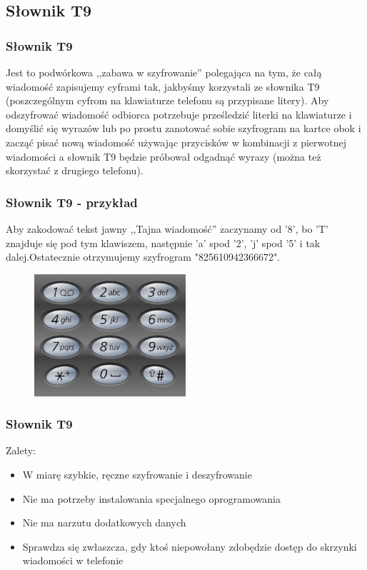 \documentclass[xcolor=table]{beamer}
\begin{document}
\subsection{Słownik T9}
\begin{frame}
  \frametitle{Słownik T9}
  Jest to podwórkowa ,,zabawa w szyfrowanie'' polegająca na tym, że całą wiadomość zapisujemy cyframi tak, jakbyśmy korzystali ze słownika T9 (poszczególnym cyfrom na klawiaturze telefonu są przypisane litery). \newline \newline Aby odszyfrować wiadomość odbiorca potrzebuje prześledzić literki na klawiaturze i domyślić się wyrazów lub po prostu zanotować sobie szyfrogram na kartce obok i zacząć pisać nową wiadomość używając przycisków w kombinacji z pierwotnej wiadomości a słownik T9 będzie próbował odgadnąć wyrazy (można też skorzystać z drugiego telefonu).
\end{frame}

\begin{frame}
  \frametitle{Słownik T9 - przykład}
Aby zakodować tekst jawny ,,Tajna wiadomość'' zaczynamy od '8', bo 'T' znajduje się pod tym klawiszem, następnie 'a' spod '2', 'j' spod '5'  i tak dalej.\newline \newline Ostatecznie otrzymujemy szyfrogram "825610942366672". 
 \begin{center}
    \begin{figure}
      \includegraphics[width=0.5\textwidth]{phone_keys}
    \end{figure}
  \end{center}
\end{frame}

\begin{frame}
  \frametitle{Słownik T9}
Zalety:
\begin{itemize}
\item W miarę szybkie, ręczne szyfrowanie i deszyfrowanie 
\item Nie ma potrzeby instalowania specjalnego oprogramowania
\item Nie ma narzutu dodatkowych danych
\item Sprawdza się zwłaszcza, gdy ktoś niepowołany zdobędzie dostęp do skrzynki wiadomości w telefonie
\end{itemize}
\end{frame}
\end{document}
